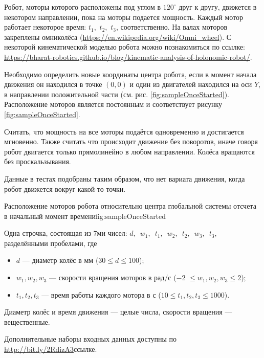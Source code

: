 
Робот, моторы которого расположены под углом в $120^{\circ}$ друг к другу,
движется в некотором направлении, пока на моторы подается мощность.
Каждый мотор работает некоторое время: $t_1$,~$t_2$,~$t_3$, соответственно.
На валах моторов закреплены омниколёса (\url{https://en.wikipedia.org/wiki/Omni_wheel}).
С некоторой кинематической моделью робота можно познакомиться по ссылке:
\url{https://bharat-robotics.github.io/blog/kinematic-analysis-of-holonomic-robot/}.

Необходимо определить новые координаты центра робота, если в момент начала движения он находился в точке
$(0,0)$ и один из двигателей находился на оси $Y$, в направлении положительной части (см. рис. \ref{fig:sampleOnceStarted}).
Расположение моторов является постоянным и соответствует рисунку \ref{fig:sampleOnceStarted}.

Считать, что мощность на все моторы подаётся одновременно и достигается мгновенно.
Также считать что происходит движение без поворотов,
иначе говоря робот двигается только прямолинейно в любом направлении.
Колёса вращаются без проскальзывания.

Данные в тестах подобраны таким образом, что нет вариата движения, когда робот движется вокруг какой-то точки.


{Расположение моторов робота относительно центра глобальной системы отсчета в начальный момент времени}{fig:sampleOnceStarted}



Одна строчка, состоящая из 7ми чисел: $d,$~$w_1,$~$t_1,$~$w_2,$~$t_2,$~$w_3,$~$t_3$, разделёнными пробелами, где
\begin{itemize}
    \item $d$ --- диаметр колёс в мм ($30 \leq d \leq 100$);
    \item $w_1, w_2, w_3$ --- скорости вращения моторов в рад/с ($-2$ $\leq w_1, w_2, w_3 \leq 2$);
    \item $t_1, t_2, t_3$ --- время работы каждого мотора в с ($10 \leq t_1, t_2, t_3 \leq 1000$).
\end{itemize}

Диаметр колёс и время движения --- целые числа, скорости вращения --- вещественные.

\commentsSection

Дополнительные наборы входных данных доступны по \url{http://bit.ly/2RdizA3}{ссылке}.

